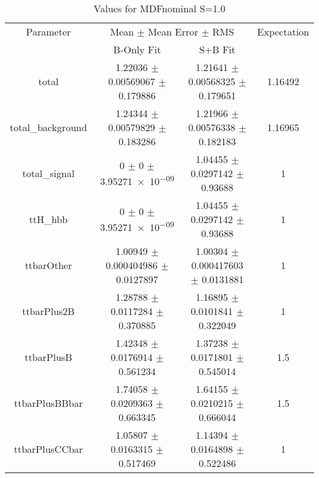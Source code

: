 \begin{table}
\centering
\caption{Values for MDFnominal S=1.0}
\begin{tabular}{cccc}
\toprule
Parameter & \multicolumn{2}{c}{Mean $\pm$ Mean Error $\pm$ RMS} & Expectation\\
 & B-Only Fit & S+B Fit & \\
\midrule
total & \num{1.22036} $\pm$ \num{0.00569067} $\pm$ \num{0.179886} & \num{1.21641} $\pm$ \num{0.00568325} $\pm$ \num{0.179651} & \num{1.16492}\\
total\_background & \num{1.24344} $\pm$ \num{0.00579829} $\pm$ \num{0.183286} & \num{1.21966} $\pm$ \num{0.00576338} $\pm$ \num{0.182183} & \num{1.16965}\\
total\_signal & \num{0} $\pm$ \num{0} $\pm$ \num{3.95271e-09} & \num{1.04455} $\pm$ \num{0.0297142} $\pm$ \num{0.93688} & \num{1}\\
ttH\_hbb & \num{0} $\pm$ \num{0} $\pm$ \num{3.95271e-09} & \num{1.04455} $\pm$ \num{0.0297142} $\pm$ \num{0.93688} & \num{1}\\
ttbarOther & \num{1.00949} $\pm$ \num{0.000404986} $\pm$ \num{0.0127897} & \num{1.00304} $\pm$ \num{0.000417603} $\pm$ \num{0.0131881} & \num{1}\\
ttbarPlus2B & \num{1.28788} $\pm$ \num{0.0117284} $\pm$ \num{0.370885} & \num{1.16895} $\pm$ \num{0.0101841} $\pm$ \num{0.322049} & \num{1}\\
ttbarPlusB & \num{1.42348} $\pm$ \num{0.0176914} $\pm$ \num{0.561234} & \num{1.37238} $\pm$ \num{0.0171801} $\pm$ \num{0.545014} & \num{1.5}\\
ttbarPlusBBbar & \num{1.74058} $\pm$ \num{0.0209363} $\pm$ \num{0.663345} & \num{1.64155} $\pm$ \num{0.0210215} $\pm$ \num{0.666044} & \num{1.5}\\
ttbarPlusCCbar & \num{1.05807} $\pm$ \num{0.0163315} $\pm$ \num{0.517469} & \num{1.14394} $\pm$ \num{0.0164898} $\pm$ \num{0.522486} & \num{1}\\
\bottomrule
\end{tabular}
\end{table}
